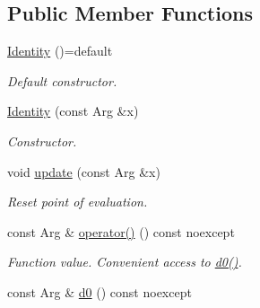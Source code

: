 \subsection*{Public Member Functions}
\begin{DoxyCompactItemize}
\item 
\hypertarget{structRFFGen_1_1Identity_a8b78693b14060a66fe32e8a15df1873a}{\hyperlink{structRFFGen_1_1Identity_a8b78693b14060a66fe32e8a15df1873a}{Identity} ()=default}\label{structRFFGen_1_1Identity_a8b78693b14060a66fe32e8a15df1873a}

\begin{DoxyCompactList}\small\item\em Default constructor. \end{DoxyCompactList}\item 
\hyperlink{structRFFGen_1_1Identity_ad1206bbe037c72a77aa90119f228f9e2}{Identity} (const Arg \&x)
\begin{DoxyCompactList}\small\item\em Constructor. \end{DoxyCompactList}\item 
\hypertarget{structRFFGen_1_1Identity_a0ddfb34c7d8f2edb9648dedf046164c8}{void \hyperlink{structRFFGen_1_1Identity_a0ddfb34c7d8f2edb9648dedf046164c8}{update} (const Arg \&x)}\label{structRFFGen_1_1Identity_a0ddfb34c7d8f2edb9648dedf046164c8}

\begin{DoxyCompactList}\small\item\em Reset point of evaluation. \end{DoxyCompactList}\item 
\hypertarget{structRFFGen_1_1Identity_a2640817a78171e80daabf623f2c786d5}{const Arg \& \hyperlink{structRFFGen_1_1Identity_a2640817a78171e80daabf623f2c786d5}{operator()} () const noexcept}\label{structRFFGen_1_1Identity_a2640817a78171e80daabf623f2c786d5}

\begin{DoxyCompactList}\small\item\em Function value. Convenient access to \hyperlink{structRFFGen_1_1Identity_a41c728eda635f547da2a0b697876ca63}{d0()}. \end{DoxyCompactList}\item 
\hypertarget{structRFFGen_1_1Identity_a41c728eda635f547da2a0b697876ca63}{const Arg \& \hyperlink{structRFFGen_1_1Identity_a41c728eda635f547da2a0b697876ca63}{d0} () const noexcept}\label{structRFFGen_1_1Identity_a41c728eda635f547da2a0b697876ca63}


\end{DoxyCompactItemize}
